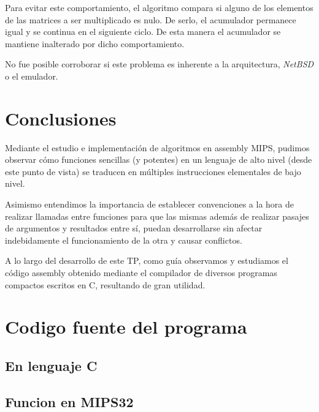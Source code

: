 \documentclass[10pt,a4paper]{article}
\begin{document}
		Para evitar este comportamiento, el algoritmo compara si alguno de los elementos de las matrices a ser multiplicado es nulo. De serlo, el acumulador permanece igual y se continua en el siguiente ciclo. De esta manera el acumulador se mantiene inalterado por dicho comportamiento.

		No fue posible corroborar si este problema es inherente a la arquitectura, \textit{NetBSD} o el emulador.

\section{Conclusiones}
	Mediante el estudio e implementación de algoritmos en assembly MIPS, pudimos observar cómo funciones sencillas (y potentes) en un lenguaje de alto nivel (desde este punto de vista) se traducen en múltiples instrucciones elementales de bajo nivel. 

	Asimismo entendimos la importancia de establecer convenciones a la hora de realizar llamadas entre funciones para que las mismas además de realizar pasajes de argumentos y resultados entre sí, puedan desarrollarse sin afectar indebidamente el funcionamiento de la otra y causar conflictos.

	A lo largo del desarrollo de este TP, como guía observamos y estudiamos el código assembly obtenido mediante el compilador de diversos programas compactos escritos en C, resultando de gran utilidad.

\newpage
\section{Codigo fuente del programa}

\subsection{En lenguaje C}



\newpage
\subsection{Funcion en MIPS32}\label{sec:mips_src}



\newpage\thispagestyle{empty}


\end{document}
